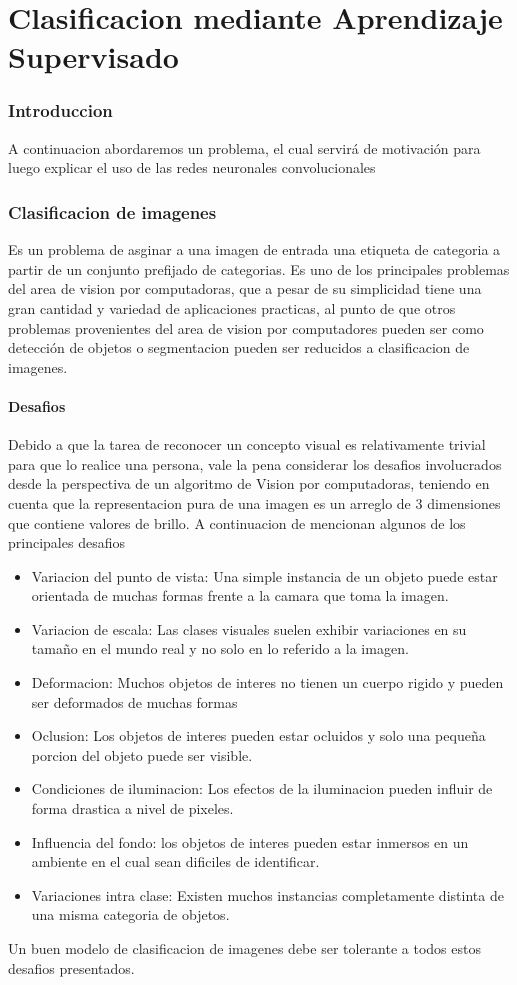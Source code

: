 \documentclass[a4paper,11pt,spanish]{book}
\begin{document}
    
    \section{Clasificacion mediante Aprendizaje Supervisado}
      \subsubsection{Introduccion}
	A continuacion abordaremos un problema, el cual servirá de motivación para luego explicar el uso de las redes neuronales convolucionales

      \subsubsection{Clasificacion de imagenes}
	Es un problema de asginar a una imagen de entrada una etiqueta de categoria a partir de un conjunto prefijado de categorias.
	Es uno de los principales problemas del area de vision por computadoras, que a pesar de su simplicidad tiene una gran cantidad y variedad de aplicaciones practicas, 
	al punto de que otros problemas provenientes del area de vision por computadores pueden ser como detección de objetos o segmentacion pueden ser reducidos a clasificacion de imagenes.

	\paragraph {Desafios}
	  Debido a que la tarea de reconocer un concepto visual es relativamente trivial para que lo realice una persona, vale la pena considerar los desafios involucrados desde la perspectiva de
	  un algoritmo de Vision por computadoras, teniendo en cuenta que la representacion pura de una imagen es un arreglo de 3 dimensiones que contiene valores de brillo. A continuacion de mencionan
	  algunos de los principales desafios
	  \begin{itemize}
	    \item Variacion del punto de vista: Una simple instancia de un objeto puede estar orientada de muchas formas frente a la camara que toma la imagen.
	    \item Variacion de escala: Las clases visuales suelen exhibir variaciones en su tamaño en el mundo real y no solo en lo referido a la imagen.
	    \item Deformacion: Muchos objetos de interes no tienen un cuerpo rigido y pueden ser deformados de muchas formas
	    \item Oclusion: Los objetos de interes pueden estar ocluidos y solo una pequeña porcion del objeto puede ser visible.
	    \item Condiciones de iluminacion: Los efectos de la iluminacion pueden influir de forma drastica a nivel de pixeles.
	    \item Influencia del fondo: los objetos de interes pueden estar inmersos en un ambiente en el cual sean dificiles de identificar.
	    \item Variaciones intra clase: Existen muchos instancias completamente distinta de una misma categoria de objetos.
	  \end{itemize}
	  Un buen modelo de clasificacion de imagenes debe ser tolerante a todos estos desafios presentados.
\end{document}
